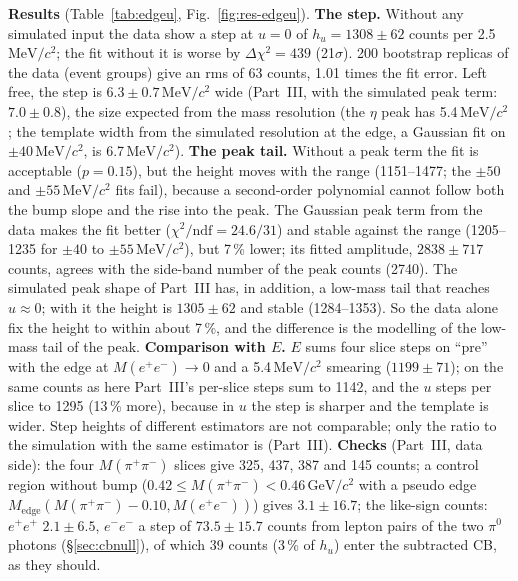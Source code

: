 \documentclass[11pt,a4paper]{article}
\newcommand{\piz}{\ensuremath{\pi^{0}}\xspace}
\newcommand{\Mee}{\ensuremath{M(e^{+}e^{-})}\xspace}
\newcommand{\Mpipi}{\ensuremath{M(\pi^{+}\pi^{-})}\xspace}
\newcommand{\GeVcc}{\ensuremath{\mathrm{GeV}/c^{2}}\xspace}
\newcommand{\MeVcc}{\ensuremath{\mathrm{MeV}/c^{2}}\xspace}
\newcommand{\Medge}{\ensuremath{M_{\mathrm{edge}}}}%
\begin{document}
\textbf{Results} (Table~\ref{tab:edgeu}, Fig.~\ref{fig:res-edgeu}). \textbf{The step.} Without any simulated input the data show a step at
$u=0$ of $h_u=1308\pm62$ counts per 2.5\,\MeVcc; the fit without it is worse by $\Delta\chi^2=439$ (21$\sigma$). 200 bootstrap replicas of
the data (event groups) give an rms of 63 counts, 1.01 times the fit error. Left free, the step is $6.3\pm0.7$\,\MeVcc wide (Part~III, with
the simulated peak term: $7.0\pm0.8$), the size expected from the mass resolution (the $\eta$ peak has 5.4\,\MeVcc; the template width
from the simulated resolution at the edge, a Gaussian fit on $\pm40$\,\MeVcc, is 6.7\,\MeVcc). \textbf{The peak tail.} Without a peak term the fit is acceptable ($p=0.15$), but the height moves
with the range (1151--1477; the $\pm50$ and $\pm55$\,\MeVcc fits fail), because a second-order polynomial cannot follow both the bump slope and the rise
into the peak. The Gaussian peak term from the data makes the fit better ($\chi^2/\mathrm{ndf}=24.6/31$) and stable against the range
(1205--1235 for $\pm40$ to $\pm55$\,\MeVcc), but 7\,\% lower; its fitted amplitude, $2838\pm717$ counts, agrees with the side-band number of the
peak counts (2740). The simulated peak shape of Part~III has, in addition, a low-mass tail that reaches $u\approx0$; with it the height is
$1305\pm62$ and stable (1284--1353). So the data alone fix the height to within about 7\,\%, and the difference is the modelling of the
low-mass tail of the peak. \textbf{Comparison with $E$.} $E$ sums four slice steps on ``pre'' with the edge at $\Mee\to0$ and a 5.4\,\MeVcc
smearing ($1199\pm71$); on the same counts as here Part~III's per-slice steps sum to 1142, and the $u$ steps per slice to 1295 (13\,\% more),
because in $u$ the step is sharper and the template is wider. Step heights of different estimators are not comparable; only the ratio to the
simulation with the same estimator is (Part~III). \textbf{Checks} (Part~III, data side): the four \Mpipi slices give 325, 437, 387 and
145 counts; a control region without bump ($0.42\le\Mpipi<0.46$\,\GeVcc with a pseudo edge $\Medge(\Mpipi-0.10,\Mee)$) gives $3.1\pm16.7$; the
like-sign counts: $e^+e^+$ $2.1\pm6.5$, $e^-e^-$ a step of $73.5\pm15.7$ counts from lepton pairs of the two \piz photons (\S\ref{sec:cbnull}), of
which 39 counts (3\,\% of $h_u$) enter the subtracted CB, as they should.
\end{document}
